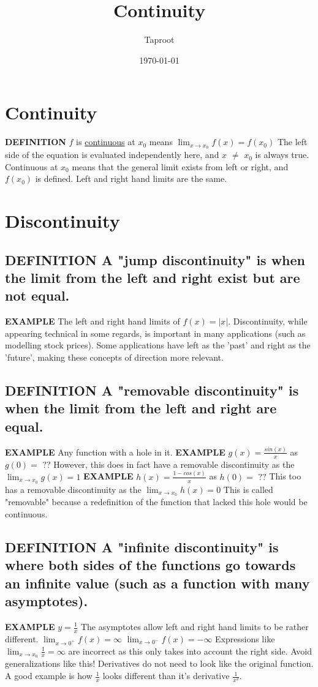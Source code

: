 \documentclass[letterpaper]{article}
\author{Taproot}
\date{\today}
\title{Continuity}
\renewcommand\maketitle{}
\begin{document}
\maketitle

\section{Continuity}
\label{sec:org674dbd8}
\textbf{DEFINITION} \(f\) is \uline{continuous} at \(x_0\) means \(\lim_{x \rightarrow x_0} f(x) = f(x_0)\)
  The left side of the equation is evaluated independently here, and \(x\) \(\neq\) \(x_0\) is always true.
Continuous at \(x_0\) means that the general limit exists from left or right, and \(f(x_0)\) is defined. Left and right hand limits are the same.

\section{Discontinuity}
\label{sec:org6c71b7f}
\subsection{\textbf{DEFINITION} A "jump discontinuity" is when the limit from the left and right exist but are not equal.}
\label{sec:org93cf963}
\textbf{EXAMPLE} The left and right hand limits of \(f(x) = |x|\).
  Discontinuity, while appearing technical in some regards, is important in many applications (such as modelling stock prices). Some applications have left as the 'past' and right as the 'future', making these concepts of direction more relevant.
\subsection{\textbf{DEFINITION} A "removable discontinuity" is when the limit from the left and right are equal.}
\label{sec:org29dbbfc}
\textbf{EXAMPLE} Any function with a hole in it.
\textbf{EXAMPLE} \(g(x) = \frac{sin(x)}{x}\) as \(g(0) = \text{ ??}\)
However, this does in fact have a removable discontinuity as the \(\lim_{x \rightarrow x_0} g(x) = 1\)
\textbf{EXAMPLE} \(h(x) = \frac{1-cos(x)}{x}\) as \(h(0) =\text{ ??}\)
This too has a removable discontinuity as the \(\lim_{x \rightarrow x_0} h(x) = 0\)
  This is called "removable" because a redefinition of the function that lacked this hole would be continuous.
\subsection{\textbf{DEFINITION} A "infinite discontinuity" is where both sides of the functions go towards an infinite value (such as a function with many asymptotes).}
\label{sec:orgf0f879c}
\textbf{EXAMPLE} \(y=\frac{1}{x}\)
The asymptotes allow left and right hand limits to be rather different.
\(\lim_{x \rightarrow 0^+} f(x) = \infty\)
\(\lim_{x \rightarrow 0^-} f(x) = - \infty\)
  Expressions like \(\lim_{x \rightarrow x_0} \frac{1}{x} = \infty\) are incorrect as this only takes into account the right side. Avoid generalizations like this!
  Derivatives do not need to look like the original function.
A good example is how \(\frac{1}{x}\) looks different than it's derivative \(\frac{1}{x^2}\).
\end{document}
